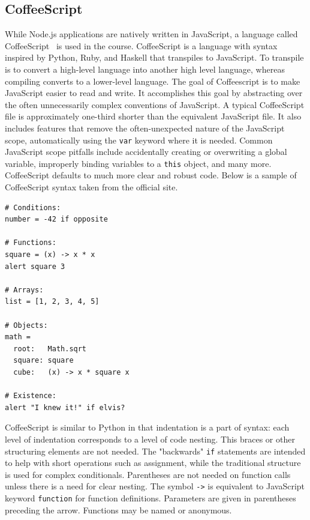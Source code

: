 \documentclass[12pt]{article}
\newcommand{\code}[1]{{\texttt {#1}}}
\begin{document}
\subsection{CoffeeScript}\label{sec:coffee}
While Node.js applications are natively written in JavaScript, a language called CoffeeScript~\cite{CoffeeScript} is used in the course. CoffeeScript is a language with syntax inspired by Python, Ruby, and Haskell that transpiles to JavaScript. To transpile is to convert a high-level language into another high level language, whereas compiling converts to a lower-level language. The goal of Coffeescript is to make JavaScript easier to read and write. It accomplishes this goal by abstracting over the often unnecessarily complex conventions of JavaScript. A typical CoffeeScript file is approximately one-third shorter than the equivalent JavaScript file. It also includes features that remove the often-unexpected nature of the JavaScript scope, automatically using the \code{var} keyword where it is needed. Common JavaScript scope pitfalls include accidentally creating or overwriting a global variable, improperly binding variables to a \code{this} object, and many more. CoffeeScript defaults to much more clear and robust code. Below is a sample of CoffeeScript syntax taken from the official site.
\begin{verbatim}
# Conditions:
number = -42 if opposite

# Functions:
square = (x) -> x * x
alert square 3

# Arrays:
list = [1, 2, 3, 4, 5]

# Objects:
math =
  root:   Math.sqrt
  square: square
  cube:   (x) -> x * square x

# Existence:
alert "I knew it!" if elvis?

\end{verbatim}
CoffeeScript is similar to Python in that indentation is a part of syntax: each level of indentation corresponds to a level of code nesting. This braces or other structuring elements are not needed.
The "backwards" \code{if} statements are intended to help with short operations such as assignment, while the traditional structure is used for complex conditionals. Parentheses are not needed on function calls unless there is a need for clear nesting. The symbol \code{->} is equivalent to JavaScript keyword \code{function} for function definitions. 
Parameters are given in parentheses preceding the arrow. 
Functions may be named or anonymous. 
\end{document}
